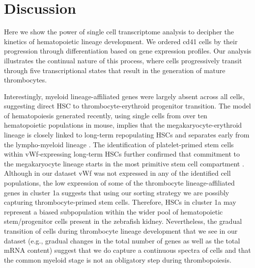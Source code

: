 \section{Discussion}

Here we show the power of single cell transcriptome analysis to decipher the kinetics of hematopoietic lineage development. We ordered cd41 cells by their progression through differentiation based on gene expression profiles. Our analysis illustrates the continual nature of this process, where cells progressively transit through five transcriptional states that result in the generation of mature thrombocytes.

Interestingly, myeloid lineage-affiliated genes were largely absent across all cells, suggesting direct HSC to thrombocyte-erythroid progenitor transition. The model of hematopoiesis generated recently, using single cells from over ten hematopoietic populations in mouse, implies that the megakaryocyte-erythroid lineage is closely linked to long-term repopulating HSCs and separates early from the lympho-myeloid lineage \cite{Guo2013-si}. The identification of platelet-primed stem cells within vWf-expressing long-term HSCs further confirmed that commitment to the megakaryocyte lineage starts in the most primitive stem cell compartment \cite{Sanjuan-Pla2013-qs}. Although in our dataset vWf was not expressed in any of the identified cell populations, the low expression of some of the thrombocyte lineage-affiliated genes in cluster 1a suggests that using our sorting strategy we are possibly capturing thrombocyte-primed stem cells. Therefore, HSCs in cluster 1a may represent a biased subpopulation within the wider pool of hematopoietic stem/progenitor cells present in the zebrafish kidney. Nevertheless, the gradual transition of cells during thrombocyte lineage development that we see in our dataset (e.g., gradual changes in the total number of genes as well as the total mRNA content) suggest that we do capture a continuous spectra of cells and that the common myeloid stage is not an obligatory step during thrombopoiesis.

